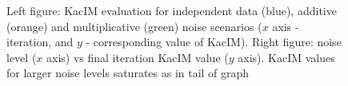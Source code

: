 \documentclass{article}
\begin{document}
\begin{figure}%
	\centering
	\qquad
	\caption{Left figure: KacIM evaluation for independent data (blue), additive (orange) and multiplicative (green) noise scenarios ($x$ axis - iteration, and $y$ - corresponding value of KacIM). Right figure: noise level ($x$ axis) vs final iteration KacIM value ($y$ axis). KacIM values for larger noise levels saturates as in tail of graph}
	\label{fig:experiments_simulation}
\end{figure}
\end{document}
